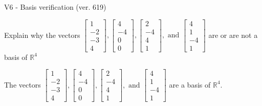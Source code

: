 \begin{exercise}
  \begin{exerciseTitle}V6 - Basis verification (ver. 619)\end{exerciseTitle}
  \begin{exerciseStatement}
    Explain why the vectors \(\left[\begin{array}{r}
1 \\
-2 \\
-3 \\
4
\end{array}\right] , \left[\begin{array}{r}
4 \\
-4 \\
0 \\
0
\end{array}\right] , \left[\begin{array}{r}
2 \\
-4 \\
4 \\
1
\end{array}\right] , \text{ and } \left[\begin{array}{r}
4 \\
1 \\
-4 \\
1
\end{array}\right]\) are or are not a basis of \(\mathbb{R}^4\)	


  \end{exerciseStatement}
  \begin{exerciseAnswer}
   The vectors \(\left[\begin{array}{r}
1 \\
-2 \\
-3 \\
4
\end{array}\right] , \left[\begin{array}{r}
4 \\
-4 \\
0 \\
0
\end{array}\right] , \left[\begin{array}{r}
2 \\
-4 \\
4 \\
1
\end{array}\right] , \text{ and } \left[\begin{array}{r}
4 \\
1 \\
-4 \\
1
\end{array}\right]\) 
  	 are  a basis of \(\mathbb{R}^4\).
  


  \end{exerciseAnswer}
\end{exercise}